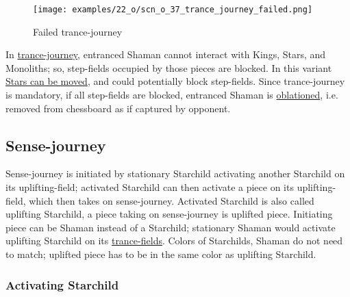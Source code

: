 \vspace*{-1.5\baselineskip}
\noindent
\begin{figure}[!h]
\texttt{[image: examples/22\_o/scn\_o\_37\_trance\_journey\_failed.png]}
\vspace*{-1.4\baselineskip}
\caption{Failed trance-journey}
\label{fig:scn_o_37_trance_journey_failed}
\end{figure}

\vspace*{-0.5\baselineskip}
In \hyperref[fig:scn_cot_52_light_shaman_trance_journey]{trance-journey}, entranced
Shaman cannot interact with Kings, Stars, and Monoliths; so, step-fields occupied by
those pieces are blocked. In this variant
\hyperref[fig:scn_o_09_starchild_moving_star_init]{Stars can be moved}, and could
potentially block step-fields. Since trance-journey is mandatory, if all step-fields
are blocked, entranced Shaman is \hyperref[sec:Terms/Oblation]{oblationed}, i.e.
removed from chessboard as if captured by opponent.

\clearpage %

\subsection*{Sense-journey}
\label{sec:One/Starchild/Sense-journey}

\vspace*{-0.7\baselineskip}
Sense-journey is initiated by stationary Starchild activating another Starchild
on its uplifting-field; activated Starchild can then activate a piece on its
uplifting-field, which then takes on sense-journey. Activated Starchild is also
called uplifting Starchild, a piece taking on sense-journey is uplifted piece.
Initiating piece can be Shaman instead of a Starchild; stationary Shaman would
activate uplifting Starchild on its
\hyperref[fig:scn_cot_40_trance_fields]{trance-fields}. Colors of Starchilds,
Shaman do not need to match; uplifted piece has to be in the same color as
uplifting Starchild.

\subsubsection*{Activating Starchild}
\label{sec:One/Starchild/Sense-journey/Activating Starchild}

